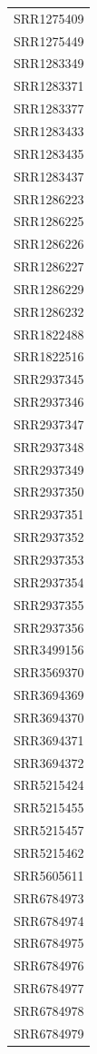 \documentclass[12pt, a4paper]{report}
\begin{document}
\begin{center}
	\begin{longtable}{c}
		SRR1275409\\
		SRR1275449\\
		SRR1283349\\
		SRR1283371\\
		SRR1283377\\
		SRR1283433\\
		SRR1283435\\
		SRR1283437\\
		SRR1286223\\
		SRR1286225\\
		SRR1286226\\
		SRR1286227\\
		SRR1286229\\
		SRR1286232\\
		SRR1822488\\
		SRR1822516\\
		SRR2937345\\
		SRR2937346\\
		SRR2937347\\
		SRR2937348\\
		SRR2937349\\
		SRR2937350\\
		SRR2937351\\
		SRR2937352\\
		SRR2937353\\
		SRR2937354\\
		SRR2937355\\
		SRR2937356\\
		SRR3499156\\
		SRR3569370\\
		SRR3694369\\
		SRR3694370\\
		SRR3694371\\
		SRR3694372\\
		SRR5215424\\
		SRR5215455\\
		SRR5215457\\
		SRR5215462\\
		SRR5605611\\
		SRR6784973\\
		SRR6784974\\
		SRR6784975\\
		SRR6784976\\
		SRR6784977\\
		SRR6784978\\
		SRR6784979\\

\end{longtable}
\end{center}
\end{document}
